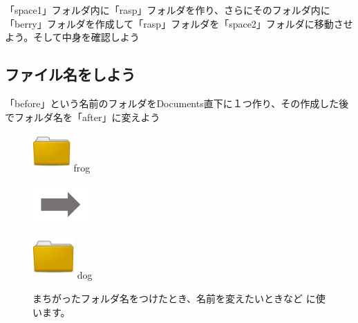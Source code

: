 \documentclass[a4paper,12pt]{jarticle}
\begin{document}
\theQuestion\label{Q:hasAnswer02-2}
「space1」フォルダ内に「rasp」フォルダを作り、さらにそのフォルダ内に「berry」フォルダを作成して「rasp」フォルダを「space2」フォルダに移動させよう。そして中身を確認しよう



\clearpage
{}
\subsection{\theExercise ファイル名をしよう}
「before」という名前のフォルダをDocuments直下に１つ作り、その作成した後でフォルダ名を「after」に変えよう

\begin{figure}[ht]

  \centering
  \begin{minipage}{1.978cm}
    \includegraphics[width=1.45cm,height=1.45cm]{textbook-img044.png}
    frog
  \end{minipage}
  \includegraphics[width=2.168cm,height=1.542cm]{textbook-img052.png}
  \begin{minipage}{1.978cm}
    \includegraphics[width=1.588cm,height=1.588cm]{textbook-img044.png}
    dog
  \end{minipage}
  \begin{minipage}{6.319cm}
    まちがったフォルダ名をつけたとき、名前を変えたいときなど
    に使います。
  \end{minipage}


\end{figure}
\end{document}
